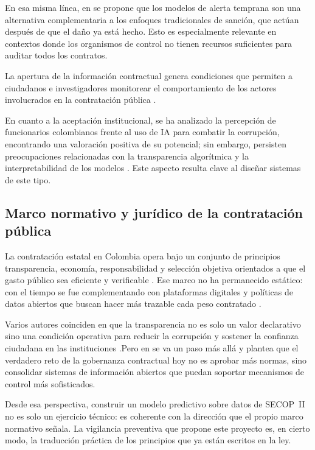 En esa misma línea, en \cite{gallego2021preventing} se propone que los modelos de alerta temprana son una alternativa complementaria a los enfoques tradicionales de sanción, que actúan después de que el daño ya está hecho. Esto es especialmente relevante en contextos donde los organismos de control no tienen recursos suficientes para auditar todos los contratos.

La apertura de la información contractual genera condiciones que permiten 
a ciudadanos e investigadores monitorear el comportamiento de los actores 
involucrados en la contratación pública \cite{sierra2025contratacion} .

En cuanto a la aceptación institucional, se ha analizado la percepción de 
funcionarios colombianos frente al uso de IA para combatir la corrupción, 
encontrando una valoración positiva de su potencial; sin embargo, persisten 
preocupaciones relacionadas con la transparencia algorítmica y la 
interpretabilidad de los modelos \cite{ospina2024percepcion} . Este aspecto resulta clave al diseñar sistemas de este tipo.

\subsection{Marco normativo y jurídico de la contratación pública}

La contratación estatal en Colombia opera bajo un conjunto de principios
transparencia, economía, responsabilidad y selección objetiva orientados a que
el gasto público sea eficiente y verificable \cite{mendieta2022regimen}. Ese marco
no ha permanecido estático: con el tiempo se fue complementando con plataformas
digitales y políticas de datos abiertos que buscan hacer más trazable cada peso
contratado \cite{sierra2025contratacion,milic2022using}.

Varios autores coinciden en que la transparencia no es solo un valor declarativo
sino una condición operativa para reducir la corrupción y sostener la confianza
ciudadana en las instituciones \cite{calderon2025contratacion,ospina2024percepcion}.Pero en 
\cite{malaret2016reto} se va un paso más allá y plantea que el verdadero reto de la
gobernanza contractual hoy no es aprobar más normas, sino consolidar sistemas de
información abiertos que puedan soportar mecanismos de control más sofisticados.

Desde esa perspectiva, construir un modelo predictivo sobre datos de SECOP~II no
es solo un ejercicio técnico: es coherente con la dirección que el propio marco
normativo señala. La vigilancia preventiva que propone este proyecto es,
en cierto modo, la traducción práctica de los principios que ya están escritos
en la ley.


